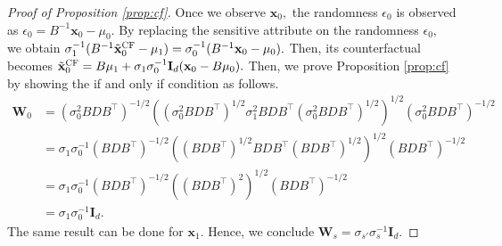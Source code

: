 \documentclass[10pt]{article} %
\begin{document}
\begin{proof}[Proof of Proposition \ref{prop:cf}]
    Once we observe $\mathbf{x}_{0},$ the randomness $\epsilon_{0}$ is observed as $\epsilon_{0} = B^{-1} \mathbf{x}_{0} - \mu_{0}.$
    By replacing the sensitive attribute on the randomness $\epsilon_{0},$ we obtain $ \sigma_{1}^{-1} (B^{-1}  \tilde{\mathbf{x}}_{0}^{\textsc{CF}} - \mu_{1} ) = \sigma_{0}^{-1} ( B^{-1} \mathbf{x}_{0} - \mu_{0} ). $
    Then, its counterfactual becomes $\tilde{\mathbf{x}}_{0}^{\textsc{CF}} = B \mu_{1} + \sigma_{1} \sigma_{0}^{-1} \mathbf{I}_{d} (\mathbf{x}_{0} - B \mu_{0}).$
    Then, we prove Proposition \ref{prop:cf} by showing the if and only if condition as follows.
    \begin{equation}
        \begin{split}
            \mathbf{W}_{0} & = ( \sigma_{0}^{2} B D B^{\top} )^{-1/2} \left( ( \sigma_{0}^{2} B D B^{\top} )^{1/2} \sigma_{1}^{2} B D B^{\top} ( \sigma_{0}^{2} B D B^{\top} )^{1/2} \right)^{1/2} ( \sigma_{0}^{2} B D B^{\top} )^{-1/2}
            \\
            & = \sigma_{1} \sigma_{0}^{-1} ( B D B^{\top} )^{-1/2} \left( ( B D B^{\top} )^{1/2} B D B^{\top} ( B D B^{\top} )^{1/2} \right)^{1/2} ( B D B^{\top} )^{-1/2} 
            \\
            & = \sigma_{1} \sigma_{0}^{-1} ( B D B^{\top} )^{-1/2} \left( ( B D B^{\top} )^{2} \right)^{1/2} ( B D B^{\top} )^{-1/2} 
            \\
            & = \sigma_{1} \sigma_{0}^{-1} \mathbf{I}_{d}.
        \end{split}
    \end{equation}
    The same result can be done for $\mathbf{x}_{1}.$
    Hence, we conclude $\mathbf{W}_{s} = \sigma_{s'} \sigma_{s}^{-1} \mathbf{I}_{d}.$
\end{proof}



\end{document}
